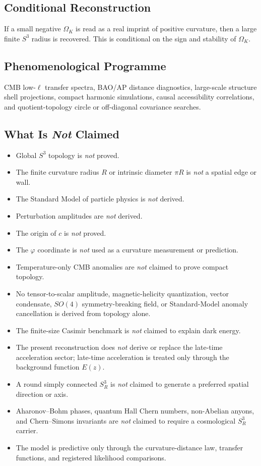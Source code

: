 \documentclass[aps,prd,onecolumn,superscriptaddress,longbibliography,nofootinbib,notitlepage]{revtex4-2}
\begin{document}
\subsection{Conditional Reconstruction}

If a small negative $\Omega_K$ is read as a real imprint of positive curvature,
then a large finite $S^3$ radius is recovered. This is conditional on the sign
and stability of $\Omega_K$.

\subsection{Phenomenological Programme}

CMB low-$\ell$ transfer spectra, BAO/AP distance diagnostics, large-scale
structure shell projections, compact harmonic simulations, causal accessibility
correlations, and quotient-topology circle or off-diagonal covariance searches.

\subsection{What Is \emph{Not} Claimed}

\begin{itemize}
  \item Global $S^3$ topology is \emph{not} proved.
  \item The finite curvature radius $R$ or intrinsic diameter $\pi R$ is \emph{not} a spatial edge or wall.
  \item The Standard Model of particle physics is \emph{not} derived.
  \item Perturbation amplitudes are \emph{not} derived.
  \item The origin of $c$ is \emph{not} proved.
  \item The $\varphi$ coordinate is \emph{not} used as a curvature measurement or prediction.
  \item Temperature-only CMB anomalies are \emph{not} claimed to prove compact topology.
  \item No tensor-to-scalar amplitude, magnetic-helicity quantization, vector condensate, $SO(4)$ symmetry-breaking field, or Standard-Model anomaly cancellation is derived from topology alone.
  \item The finite-size Casimir benchmark is \emph{not} claimed to explain dark energy.
  \item The present reconstruction does \emph{not} derive or replace the late-time acceleration sector; late-time acceleration is treated only through the background function $E(z)$.
  \item A round simply connected $S^3_R$ is \emph{not} claimed to generate a preferred spatial direction or axis.
  \item Aharonov--Bohm phases, quantum Hall Chern numbers, non-Abelian anyons, and Chern--Simons invariants are \emph{not} claimed to require a cosmological $S^3_R$ carrier.
  \item The model is predictive only through the curvature-distance law, transfer functions, and registered likelihood comparisons.
\end{itemize}
\end{document}
